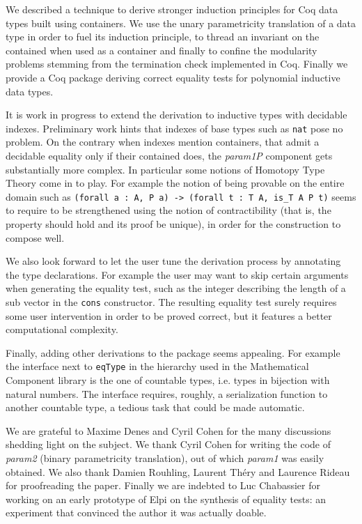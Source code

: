 \documentclass[a4paper,UKenglish,cleveref, autoref]{lipics-v2019}
\newcommand{\derive}[1]{\emph{#1}}
\begin{document}
We described a technique to derive stronger induction principles for Coq data
types built using containers. We use the unary parametricity translation of a
data type in order to fuel its induction principle, to thread an invariant on
the contained when used as a container and finally to confine the modularity
problems stemming from the termination check implemented in Coq.  Finally we
provide a Coq package deriving correct equality tests for polynomial inductive
data types.

It is work in progress to extend the derivation to 
inductive types with decidable indexes. Preliminary work hints that
indexes of base types such as \lstinline+nat+ pose no problem.
On the contrary when indexes mention containers, that admit a decidable
equality only if their contained does,
the \derive{param1P} component gets 
substantially more complex. In particular some notions of Homotopy Type Theory
come in to play. For example the notion of being provable on the entire domain
such as \lstinline+(forall a : A, P a) -> (forall t : T A, is_T A P t)+ seems
to require to be strengthened using the notion of contractibility (that
is, the property should hold and its proof be unique), in order for the
construction to compose well.


We also look forward to let the user tune
the derivation process by annotating the type declarations.
For example the user may want to skip
certain arguments when generating the equality test, such as the
integer describing the length of a sub vector in the \lstinline+cons+
constructor. The resulting equality
test surely requires some user intervention in order 
to be proved correct, but it features a better computational complexity.

Finally, adding other derivations to the package seems appealing. For example
the interface next to \lstinline+eqType+ in the hierarchy used
in the Mathematical Component library is the one of countable types,
i.e. types in bijection with natural numbers. The interface
requires, roughly, a serialization function to another countable
type, a tedious task that could be made automatic.

We are grateful to Maxime Denes and Cyril Cohen for the many discussions
shedding light on the subject. We thank Cyril Cohen for writing the code 
of \derive{param2} (binary parametricity translation), out of which
\derive{param1} was easily obtained.  
We also thank Damien Rouhling, Laurent Th\'ery and Laurence Rideau
for proofreading the paper.
Finally we are indebted
to Luc Chabassier for working on an early prototype of Elpi on
the synthesis of equality tests: an experiment that convinced
the author it was actually doable.





\end{document}
